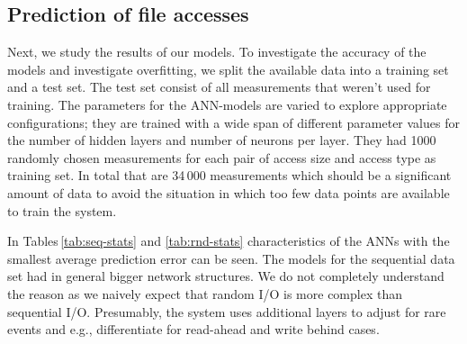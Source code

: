 \documentclass{superfri}
\begin{document}
	\subsection{Prediction of file accesses}
	Next, we study the results of our models.
	To investigate the accuracy of the models and investigate overfitting, we split the available data into a training set and a test set. 
	The test set consist of all measurements that weren't used for training.
	The parameters for the ANN-models are varied to explore appropriate configurations; they are trained with a wide span of different parameter values for the number of hidden layers and number of neurons per layer.
	They had 1000 randomly chosen measurements for each pair of access size and access type as training set.
	In total that are 34\,000 measurements which should be a significant amount of data to avoid the situation in which too few data points are available to train the system. 
	
	\medskip
	
	In Tables\,\ref{tab:seq-stats} and \ref{tab:rnd-stats} characteristics of the ANNs with the smallest average prediction error can be seen.
	The models for the sequential data set had in general bigger network structures.
	We do not completely understand the reason as we naively expect that random I/O is more complex than sequential I/O.
	Presumably, the system uses additional layers to adjust for rare events and e.g., differentiate for read-ahead and write behind cases.
	
\end{document}
